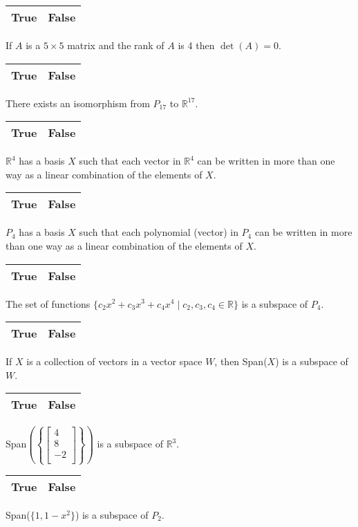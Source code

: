 \documentclass[10pt]{exam}
\begin{document}
\begin{questions}
\question
\begin{choices}
\choice \begin{tabular}{|c|c|}\hline True & False \\ \hline \end{tabular} If $A$ is a $5\times 5$ matrix and the rank of $A$ is 4 then $\det(A)=0$.
\choice \begin{tabular}{|c|c|}\hline True & False \\ \hline \end{tabular} There exists an isomorphism from $P_{17}$ to $\mathbb{R}^{17}$.
\choice \begin{tabular}{|c|c|}\hline True & False \\ \hline \end{tabular}  $\mathbb{R}^4$ has a basis $X$ such that each vector in  $\mathbb{R}^4$ can be written in more than one way as a linear combination of the elements of $X$.
\choice \begin{tabular}{|c|c|}\hline True & False \\ \hline \end{tabular} $P_4$ has a basis $X$ such that each polynomial (vector) in $P_4$ can be written in more than one way as a linear combination of the elements of $X$.
\choice \begin{tabular}{|c|c|}\hline True & False \\ \hline \end{tabular} The set of functions $\{c_2 x^2 + c_3 x^3 + c_4 x^4 \mid c_2,c_3,c_4 \in \mathbb{R} \}$ is a subspace of $P_4$.
\choice \begin{tabular}{|c|c|}\hline True & False \\ \hline \end{tabular} If $X$ is a collection of vectors in a vector space $W$, then Span($X$) is a subspace of $W$.
\choice \begin{tabular}{|c|c|}\hline True & False \\ \hline \end{tabular} Span$\left(\left \{ \left[ \begin{array}{r} 4 \\ 8 \\ -2\\ \end{array}\right] \right \} \right)$ is a subspace of $\mathbb{R}^3$.
\choice \begin{tabular}{|c|c|}\hline True & False \\ \hline \end{tabular} Span($\{1,1-x^2\}$) is a subspace of $P_2$.

\end{choices}
\end{questions}
\end{document}
